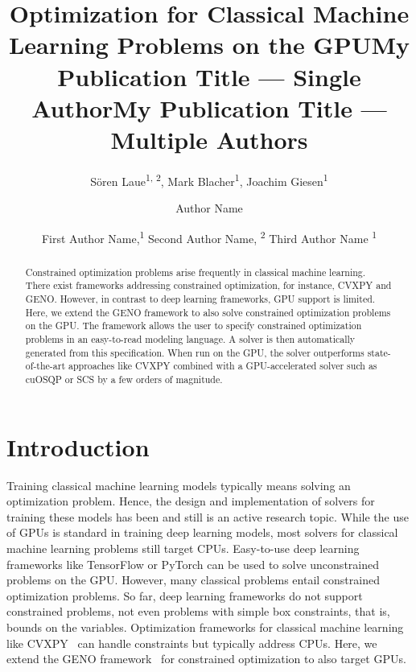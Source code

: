 \documentclass[letterpaper]{article} %
\title{Optimization for Classical Machine Learning Problems on the GPU}
\author {
    S\"oren Laue\textsuperscript{\rm 1, 2},
    Mark Blacher\textsuperscript{\rm 1},
    Joachim Giesen\textsuperscript{\rm 1}
}
\title{My Publication Title --- Single Author}
\author {
    Author Name
}
\title{My Publication Title --- Multiple Authors}
\author {
    First Author Name,\textsuperscript{\rm 1}
    Second Author Name, \textsuperscript{\rm 2}
    Third Author Name \textsuperscript{\rm 1}
}
\begin{document}
\maketitle
\thispagestyle{plain}
\pagestyle{plain}

\begin{abstract}
Constrained optimization problems arise frequently in classical machine learning. There exist frameworks addressing constrained optimization, for instance, CVXPY and GENO. However, in contrast to deep learning frameworks, GPU support is limited. Here, we extend the GENO framework to also solve constrained optimization problems on the GPU. The framework allows the user to specify constrained optimization problems in an easy-to-read modeling language. A solver is then automatically generated from this specification. When run on the GPU, the solver outperforms state-of-the-art approaches like CVXPY combined with a GPU-accelerated solver such as cuOSQP or SCS by a few orders of magnitude.%
\end{abstract}




\section{Introduction}


Training classical machine learning models typically means solving an optimization problem. Hence, the design and implementation of solvers for training these models has been and still is an active research topic. While the use of GPUs is standard in training deep learning models, most solvers for classical machine learning problems still target CPUs.  Easy-to-use deep learning frameworks like TensorFlow or PyTorch can be used to solve unconstrained problems on the GPU. However, many classical problems entail constrained optimization problems. So far,  deep learning frameworks do not support constrained problems, not even problems with simple box constraints, that is, bounds on the variables. Optimization frameworks for classical machine learning like CVXPY~\cite{AgrawalVDB18, DiamondB16} can handle constraints but typically address CPUs. Here, we extend the GENO framework~\cite{LaueMG2019} for constrained optimization to also target GPUs.
\end{document}
